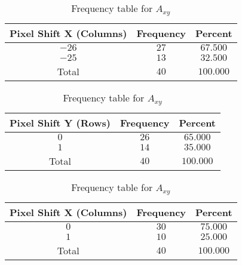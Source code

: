 \begin{table}[h]
	\centering
    \begin{subtable}{\textwidth}
        \centering
        \footnotesize
        {
            \begin{tabular}{ccc}
                \toprule
                Pixel Shift X (Columns) & Frequency & Percent  \\
                \midrule
                $-26$ & $27$ & $67.500$ \\
                $-25$ & $13$ & $32.500$ \\
                Total & $40$ & $100.000$ \\
                \bottomrule
            \end{tabular}
        }
        \caption{Frequency table for $A_{xx}$}
        \label{subtable:freq_table_axx}
    \end{subtable}

    \vspace{10pt}

    \begin{subtable}{\textwidth}
        \centering
        \footnotesize
        {
            \begin{tabular}{ccc}
                \toprule
                Pixel Shift Y (Rows) & Frequency & Percent \\
                \midrule
                $0$ & $26$ & $65.000$ \\
                $1$ & $14$ & $35.000$ \\
                Total & $40$ & $100.000$ \\
                \bottomrule
            \end{tabular}
        }
        \caption{Frequency table for $A_{yx}$}
        \label{subtable:freq_table_ayx}
    \end{subtable}

    \vspace{10pt}

    \begin{subtable}{\textwidth}
        \centering
        \footnotesize
        {
            \begin{tabular}{ccc}
                \toprule
                Pixel Shift X (Columns) & Frequency & Percent  \\
                \midrule
                $0$ & $30$ & $75.000$  \\
                $1$ & $10$ & $25.000$  \\
                Total & $40$ & $100.000$  \\
                \bottomrule
            \end{tabular}
        }
        \caption{Frequency table for $A_{xy}$}
        \label{subtable:freq_table_axy}
    \end{subtable}


\end{table}
